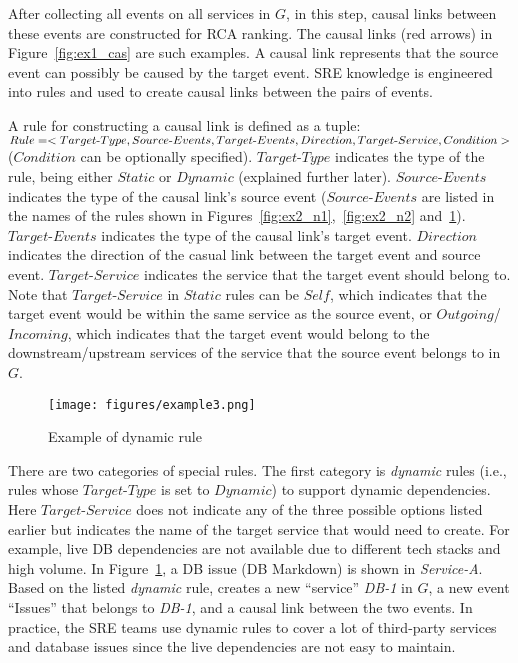 After collecting all events on all services in $G$, in this step, causal links between these events are constructed for RCA ranking. The causal links (red arrows) in Figure~\ref{fig:ex1_cas} are such examples. A causal link represents that the source event can possibly be caused by the target event. SRE knowledge is engineered into rules and used to create causal links between the pairs of events. %

A rule for constructing a causal link is defined as a tuple:  $Rule = <Target\mbox{-}Type,  Source\mbox{-}Events, Target\mbox{-}Events, Direction,\\ Target\mbox{-}Service,  Condition>$  ($Condition$ can be optionally specified). $Target\mbox{-}Type$ indicates the type of the rule, being either $Static$ or $Dynamic$ (explained further later). $Source\mbox{-}Events$ indicates the type of the causal link's source event ($Source\mbox{-}Events$ are listed in the names of the rules shown in Figures~\ref{fig:ex2_n1},~\ref{fig:ex2_n2} and~\ref{fig:dynamic_example}).   $Target\mbox{-}Events$ indicates the type of the causal link's target event. $Direction$ indicates the direction of the casual link between the target event and source event. $Target\mbox{-}Service$ indicates the service that the target event should belong to. Note that $Target\mbox{-}Service$ in $Static$ rules can be  $Self$, which indicates that the target event would be within the same service as the source event, or $Outgoing$/$Incoming$, which indicates that the target event would belong to the downstream/upstream services of the service that the source event belongs to in $G$.

\begin{figure}[t]
\centering
\texttt{[image: figures/example3.png]}
\caption{Example of dynamic rule}
\label{fig:dynamic_example}
\end{figure}

There are two categories of special rules. The first category is \emph{dynamic} rules (i.e., rules whose $Target\mbox{-}Type$  is set to $Dynamic$) to support dynamic dependencies. Here $Target\mbox{-}Service$ does not indicate any of the three possible options listed earlier but indicates the name of the target service that \system would need to create. For example, live DB dependencies are not available due to different tech stacks and high volume. In Figure~\ref{fig:dynamic_example}, a DB issue (DB Markdown) is shown in \emph{Service-A}. Based on the listed \emph{dynamic} rule, \system creates a new ``service'' \emph{DB-1} in $G$, a new event ``Issues'' that belongs to \emph{DB-1}, and a causal link between the two events.  In practice, the SRE teams use dynamic rules to cover a lot of third-party services and database issues since the live dependencies are not easy to maintain.  %

